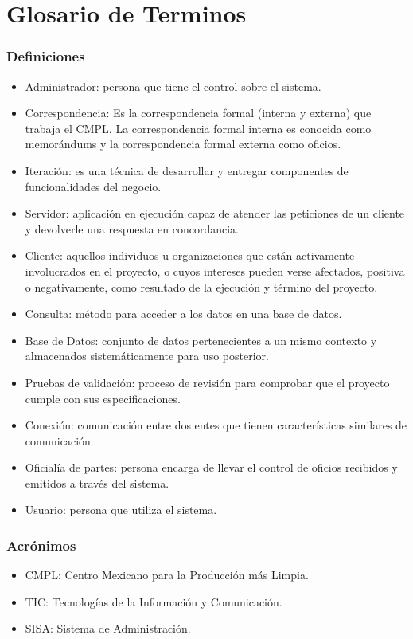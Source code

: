 \section{Glosario de Terminos}

\subsubsection{Definiciones}

\begin{itemize}
	\item Administrador: persona que tiene el control sobre el sistema.
	\item Correspondencia: Es la correspondencia formal (interna y externa) que trabaja el CMPL. La correspondencia formal interna es conocida como memorándums y la correspondencia formal externa como oficios.
	\item Iteración: es una técnica de desarrollar y entregar componentes de funcionalidades del negocio.
	\item Servidor: aplicación en ejecución capaz de atender las peticiones de un cliente y devolverle una respuesta en concordancia.
	\item Cliente: aquellos individuos u organizaciones que están activamente involucrados en el proyecto, o cuyos intereses pueden verse afectados, positiva o negativamente, como resultado de la ejecución y término del proyecto. \cite{cliente}
	\item Consulta: método para acceder a los datos en una base de datos.
	\item Base de Datos: conjunto de datos pertenecientes a un mismo contexto y almacenados sistemáticamente para uso posterior.
	\item Pruebas de validación: proceso de revisión para comprobar que el proyecto cumple con sus especificaciones.
	\item Conexión: comunicación entre dos entes que tienen características similares de comunicación.
	\item Oficialía de partes: persona encarga de llevar el control de oficios recibidos y emitidos a través del sistema.
	\item Usuario: persona que utiliza el sistema.
\end{itemize}

\subsubsection{Acrónimos}

\begin{itemize}
	\item CMPL: Centro Mexicano para la Producción más Limpia.
	\item TIC: Tecnologías de la Información y Comunicación.
	\item SISA: Sistema de Administración.
\end{itemize}
